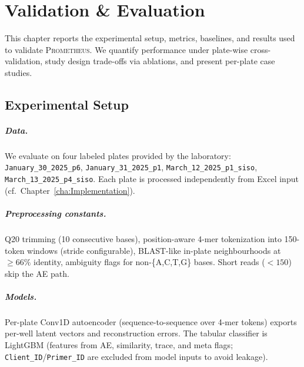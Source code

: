 
%

\chapter{Validation \& Evaluation}
\label{cha:Evaluation}

This chapter reports the experimental setup, metrics, baselines, and results used to validate \textsc{Prometheus}. We quantify performance under plate-wise cross-validation, study design trade-offs via ablations, and present per-plate case studies.

\section{Experimental Setup}
\label{sec:exp_setup}
\paragraph{Data.}
We evaluate on four labeled plates provided by the laboratory:
\texttt{January\_30\_2025\_p6},
\texttt{January\_31\_2025\_p1},
\texttt{March\_12\_2025\_p1\_siso},
\texttt{March\_13\_2025\_p4\_siso}.
Each plate is processed independently from Excel input (cf.~Chapter~\ref{cha:Implementation}).

\paragraph{Preprocessing constants.}
Q20 trimming (10 consecutive bases), position-aware 4-mer tokenization into 150-token windows (stride configurable), BLAST-like in-plate neighbourhoods at $\geq 66\%$ identity, ambiguity flags for non-\{A,C,T,G\} bases. Short reads ($<150$) skip the AE path.

\paragraph{Models.}
Per-plate Conv1D autoencoder (sequence-to-sequence over 4-mer tokens) exports per-well latent vectors and reconstruction errors. The tabular classifier is LightGBM (features from AE, similarity, trace, and meta flags; \texttt{Client\_ID}/\texttt{Primer\_ID} are excluded from model inputs to avoid leakage).

